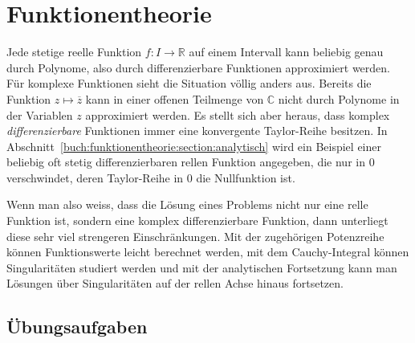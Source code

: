 %
%
%
\chapter{Funktionentheorie
\label{buch:chapter:funktionentheorie}}
\rhead{}
Jede stetige reelle Funktion $f\colon I\to\mathbb{R}$ auf einem
Intervall kann beliebig genau durch Polynome, also durch
differenzierbare Funktionen approximiert werden.
Für komplexe Funktionen sieht die Situation völlig anders aus.
Bereits die Funktion $z\mapsto \overline{z}$ kann in einer offenen
Teilmenge von $\mathbb{C}$ nicht durch Polynome in der Variablen $z$
approximiert werden.
Es stellt sich aber heraus, dass  komplex {\em differenzierbare} Funktionen
immer eine konvergente Taylor-Reihe besitzen.
In Abschnitt~\ref{buch:funktionentheorie:section:analytisch} wird
ein Beispiel einer beliebig oft stetig differenzierbaren rellen
Funktion angegeben, die nur in $0$ verschwindet, deren Taylor-Reihe
in $0$ die Nullfunktion ist.

Wenn man also weiss, dass die Lösung eines Problems nicht nur eine
relle Funktion ist, sondern eine komplex differenzierbare Funktion,
dann unterliegt diese sehr viel strengeren Einschränkungen.
Mit der zugehörigen Potenzreihe können Funktionswerte leicht berechnet
werden, mit dem Cauchy-Integral können Singularitäten studiert werden
und mit der analytischen Fortsetzung kann man Lösungen über Singularitäten
auf der rellen Achse hinaus fortsetzen.







\section*{Übungsaufgaben}
\begin{uebungsaufgaben}
\end{uebungsaufgaben}


